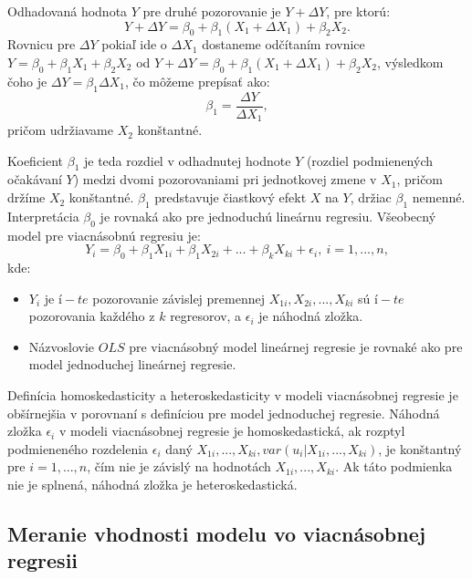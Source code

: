 \documentclass[]{tukediphc}
\begin{document}
Odhadovaná hodnota $Y$ pre druhé pozorovanie je $Y + \Delta Y$, pre ktorú:
\begin{equation}
    Y + \Delta Y = \beta_{0} + \beta_{1} (X_{1} + \Delta X_{1}) + \beta_{2} X_{2}.
\end{equation}
Rovnicu pre $\Delta Y$ pokiaľ ide o $\Delta X_{1}$ dostaneme odčítaním rovnice $Y = \beta_{0} + \beta_{1} X_{1} + \beta_{2} X_{2}$ od $Y + \Delta Y = \beta_{0} + \beta_{1} (X_{1} + \Delta X_{1}) + \beta_{2} X_{2}$, výsledkom čoho je $\Delta Y = \beta_{1}\Delta X_{1}$, čo môžeme prepísať ako:
\begin{equation}
    \beta_{1} = \frac{\Delta Y}{\Delta X_{1}},
\end{equation}
pričom udržiavame $X_2$ konštantné.

Koeficient $\beta_{1}$ je teda rozdiel v odhadnutej hodnote $Y$ (rozdiel podmienených očakávaní $Y$) medzi dvomi pozorovaniami pri jednotkovej zmene v $X_1$, pričom držíme $X_2$ konštantné. $\beta_{1}$ predstavuje čiastkový efekt $X$ na $Y$, držiac $\beta_{1}$ nemenné. Interpretácia $\beta_{0}$ je rovnaká ako pre jednoduchú lineárnu regresiu.  
Všeobecný model pre viacnásobnú regresiu je:
\begin{equation}
    Y_{i} = \beta_{0} + \beta_{1} X_{1i} + \beta_{1} X_{2i} + ... + \beta_{k} X_{ki} + \epsilon_{i}, \ i = 1, ..., n,
\end{equation}
kde:
\begin{itemize}
\item  $Y_i$ je $í-te$ pozorovanie závislej premennej $X_{1i}, X_{2i}, ..., X_{ki}$ sú $í-te$ pozorovania každého z $k$ regresorov, a $\epsilon_i$ je náhodná zložka.
\item Názvoslovie $OLS$ pre viacnásobný model lineárnej regresie je rovnaké ako pre model jednoduchej lineárnej regresie. 
\end{itemize}

Definícia homoskedasticity a heteroskedasticity v modeli viacnásobnej regresie je obšírnejšia v porovnaní s definíciou pre model jednoduchej regresie. Náhodná zložka $\epsilon_{i}$ v modeli viacnásobnej regresie je homoskedastická, ak rozptyl podmieneného rozdelenia $\epsilon_{i}$ daný $X_{1i}, ..., X_{ki}, var(u_{i}|X_{1i}, ..., X_{ki})$, je konštantný pre $i = 1, ..., n$, čím nie je závislý na hodnotách $X_{1i}, ..., X_{ki}$. Ak táto podmienka nie je splnená, náhodná zložka je heteroskedastická.

\subsection{Meranie vhodnosti modelu vo viacnásobnej regresii}
\end{document}
